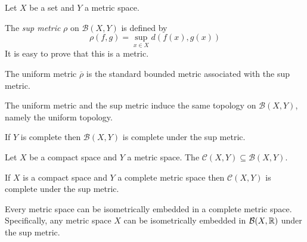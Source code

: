 \begin{definition}
    Let $X$ be a set and $Y$ a metric space. 
    
    The \emph{sup metric} $\rho$ on $\mathcal{B}(X,Y)$ is defined by
    \[ \rho(f,g) = \sup_{x \in X} d(f(x),g(x)) \]
    It is easy to prove that this is a metric.
\end{definition}

\begin{proposition}
    The uniform metric $\overline{\rho}$ is the standard bounded metric associated with the sup metric.
\end{proposition}

\begin{corollary}
    The uniform metric and the sup metric induce the same topology on $\mathcal{B}(X,Y)$, namely the uniform topology.
\end{corollary}

\begin{corollary}
    If $Y$ is complete then $\mathcal{B}(X,Y)$ is complete under the sup metric.
\end{corollary}

\begin{proposition}
    Let $X$ be a compact space and $Y$ a metric space. The $\mathcal{C}(X,Y) \subseteq \mathcal{B}(X,Y)$.
\end{proposition}

\begin{corollary}
    If $X$ is a compact space and $Y$ a complete metric space then $\mathcal{C}(X,Y)$ is complete under the sup metric.
\end{corollary}

\begin{theorem}
    Every metric space can be isometrically embedded in a complete metric space. Specifically, any metric space $X$ can be
    isometrically embedded in $\mathcal{B}(X,\mathbb{R})$ under the sup metric.
\end{theorem}

